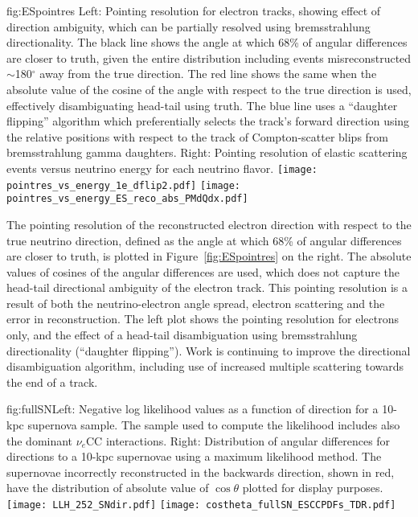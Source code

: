 \begin{dunefigure}{fig:ESpointres}{ Left: Pointing resolution for electron
    tracks, showing effect of direction ambiguity, which can be
    partially resolved using bremsstrahlung directionality.  The black
    line shows the angle at which 68\% of angular differences are
    closer to truth, given the entire distribution including events
    misreconstructed $\sim$180$^\circ$ away from the true direction.
    The red line shows the same when the absolute value of the cosine
    of the angle with respect to the true direction is used,
    effectively disambiguating head-tail using truth.  The blue line uses a
    ``daughter flipping'' algorithm which preferentially selects the
    track's    forward direction using the relative positions with respect to the
    track of Compton-scatter blips from bremsstrahlung gamma
    daughters.
    Right: Pointing resolution of elastic scattering
    events versus neutrino energy for each neutrino flavor.}
\texttt{[image: pointres\_vs\_energy\_1e\_dflip2.pdf]}
\texttt{[image: pointres\_vs\_energy\_ES\_reco\_abs\_PMdQdx.pdf]}
\end{dunefigure}


The pointing resolution of the reconstructed electron direction with
respect to the true neutrino direction, defined as the angle at which
68\% of angular differences are closer to truth, is plotted in
Figure~\ref{fig:ESpointres} on the right.
The absolute values of cosines of the
angular differences are used, which does not capture the head-tail
directional ambiguity of the electron track.
This pointing resolution is a result of both the neutrino-electron
angle spread, electron scattering and the error in reconstruction.  The left plot shows the
pointing resolution for electrons only, and the effect of a head-tail disambiguation
using bremsstrahlung directionality (``daughter flipping'').  Work is
continuing to improve the directional disambiguation algorithm,
including use of increased multiple
scattering towards the end of a track.

\begin{dunefigure}{fig:fullSN}{Left:
    Negative log
    likelihood values as a function of direction for a 10-kpc
    supernova sample.  The sample used to compute the likelihood
    includes also the dominant $\nu_e$CC interactions.  Right: Distribution of angular differences for
    directions to a 10-kpc supernovae using a maximum likelihood
    method. The supernovae incorrectly reconstructed in the backwards direction,
    shown in red,
  have the distribution of absolute value of $\cos \theta$ plotted for display purposes. }
  \texttt{[image: LLH\_252\_SNdir.pdf]}
  \texttt{[image: costheta\_fullSN\_ESCCPDFs\_TDR.pdf]}
\end{dunefigure}

